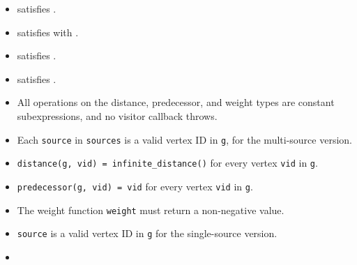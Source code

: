 \begin{itemdescr}
      \pnum\mandates
            \begin{itemize}
                  \item {} satisfies .
                  \item {} satisfies 
                        with .
                  \item {} satisfies .
                  \item {} satisfies .
            \end{itemize}
      \pnum\constantwhen
            \begin{itemize}
                  \item All operations on the distance, predecessor, and weight types
                        are constant subexpressions, and no visitor callback throws.
            \end{itemize}
      \pnum\preconditions
            \begin{itemize}
                  \item
                        Each \lstinline{source} in \lstinline{sources} is a valid vertex ID in \lstinline{g},
                        for the multi-source version.
                  \item
                        \lstinline{distance(g, vid) = infinite_distance()} for every vertex \lstinline{vid} in \lstinline{g}.
                  \item
                        \lstinline{predecessor(g, vid) = vid} for every vertex \lstinline{vid} in \lstinline{g}.
                  \item
                        The weight function \lstinline{weight} must return a non-negative value.
            \end{itemize}
      \pnum\hardprecond
            \begin{itemize}
                  \item \lstinline{source} is a valid vertex ID in \lstinline{g} for the single-source version.
            \end{itemize}
      \pnum\effects
            \begin{itemize}
                  \item

\end{itemize}
\end{itemdescr}
